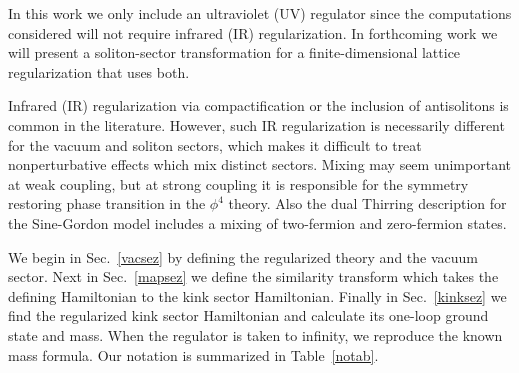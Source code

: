 \def\letter{0}\def\pr{0}\documentclass[a4paper,12pt, epsfig]{article}
\renewcommand{\(}{\begin{equation}}
\renewcommand{\)}{end{equation} \vspace{-.05in}\linebreak}
\renewcommand{\=}{\hspace{-.03in}=\hspace{-.02in}}
\renewcommand{\(}{\begin{equation}}
\renewcommand{\)}{\end{equation}}
\renewcommand{\(}{\begin{equation}}
\renewcommand{\)}{\end{equation}}
\begin{document}
In this work we only include an ultraviolet (UV) regulator since the computations considered will not require infrared (IR) regularization.  In forthcoming work we will present a soliton-sector transformation for a finite-dimensional lattice regularization that uses both.  

Infrared (IR) regularization via compactification or the inclusion of antisolitons is common in the literature.  However, such IR regularization is necessarily different for the vacuum and soliton sectors, which makes it difficult to treat nonperturbative effects which mix distinct sectors.  Mixing may seem unimportant at weak coupling, but at strong coupling it is responsible for the symmetry restoring phase transition in the $\phi^4$ theory.  Also the dual Thirring description for the Sine-Gordon model includes a mixing of two-fermion and zero-fermion states.

We begin in Sec.~\ref{vacsez} by defining the regularized theory and the vacuum sector.  Next in Sec.~\ref{mapsez} we define the similarity transform which takes the defining Hamiltonian to the kink sector Hamiltonian.  Finally in Sec.~\ref{kinksez} we find the regularized kink sector Hamiltonian and calculate its one-loop ground state and mass.  When the regulator is taken to infinity, we reproduce the known mass formula.  Our notation is summarized in Table~\ref{notab}.
\end{document}
